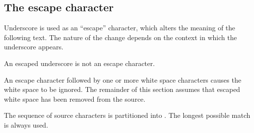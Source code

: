 {\subsection{The escape character}%
Underscore is used as an ``escape'' character, which alters the meaning
of the following text.  The nature of the change depends on the context
in which the underscore appears.  

An escaped underscore is not an escape character.

An escape character followed by one or more white space characters
causes the white space to be ignored.
The remainder of this section assumes that escaped white space has been
removed from the source.
}

%
The sequence of source characters is partitioned into .
The longest possible match is always used.

